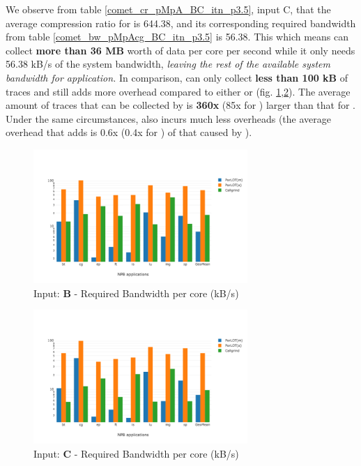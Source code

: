 We observe from table \ref{comet_cr_pMpA_BC_itn_p3.5}, input C, that the
average compression ratio for \parlota is 644.38, and its
corresponding required bandwidth from table
\ref{comet_bw_pMpAcg_BC_itn_p3.5} is 56.38.
%
This which means \parlot can
collect \textbf{more than 36 MB} worth of data per core per second
while it only needs 56.38 kB/s of the system bandwidth, {\em leaving the rest of
the available system bandwidth for application.}
%
In comparison, \callgrind can only
collect \textbf{less than 100 kB} of traces and still adds more
overhead compared to either \parlota or \parlotm
(fig. \ref{comet_chartAvg_bw_B_p3_5},\ref{comet_chartAvg_bw_C_p3_5}). 
%
The average amount of traces that can be collected by \parlota is
\textbf{360x} (85x for \parlotm) larger than that for \callgrind.
%
Under the same circumstances,
\parlota also incurs much less overheads (the
average overhead that \parlota adds is 0.6x (0.4x for \parlotm)
of that caused by \callgrind).

\begin{figure}[!t]
\centering
\includegraphics[width=3.2in]{figs.comet.newMed/comet_chartAvg_bw_B_p3_5.png}
\caption{ Input: \textbf{B} - Required Bandwidth per core (kB/s)
}
\label{comet_chartAvg_bw_B_p3_5}
\end{figure}



\begin{figure}[!t]
\centering
\includegraphics[width=3.2in]{figs.comet.newMed/comet_chartAvg_bw_C_p3_5.png}
\caption{ Input: \textbf{C}  - Required Bandwidth per core (kB/s)
}
\label{comet_chartAvg_bw_C_p3_5}
\end{figure}


